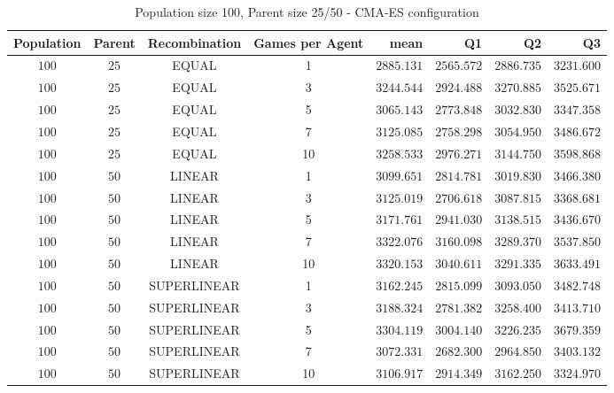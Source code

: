 \begin{table}[H]
\centering
\small
\begin{tabular}{c c c c r r r r}
Population & Parent & Recombination & Games per Agent & mean & Q1 & Q2 & Q3\\
\hline
$100$ & $25$ & EQUAL & 1 & $2885.131$ & $2565.572$ & $2886.735$ & $3231.600$\\
\hdashline
$100$ & $25$ & EQUAL & 3 & $3244.544$ & $2924.488$ & $3270.885$ & $3525.671$\\
\hdashline
$100$ & $25$ & EQUAL & 5 & $3065.143$ & $2773.848$ & $3032.830$ & $3347.358$\\
$100$ & $25$ & EQUAL & 7 & $3125.085$ & $2758.298$ & $3054.950$ & $3486.672$\\
$100$ & $25$ & EQUAL & 10 & $3258.533$ & $2976.271$ & $3144.750$ & $3598.868$\\
$100$ & $50$ & LINEAR & 1 & $3099.651$ & $2814.781$ & $3019.830$ & $3466.380$\\
$100$ & $50$ & LINEAR & 3 & $3125.019$ & $2706.618$ & $3087.815$ & $3368.681$\\
$100$ & $50$ & LINEAR & 5 & $3171.761$ & $2941.030$ & $3138.515$ & $3436.670$\\
\hdashline
$100$ & $50$ & LINEAR & 7 & $3322.076$ & $3160.098$ & $3289.370$ & $3537.850$\\
\hdashline
$100$ & $50$ & LINEAR & 10 & $3320.153$ & $3040.611$ & $3291.335$ & $3633.491$\\
$100$ & $50$ & SUPERLINEAR & 1 & $3162.245$ & $2815.099$ & $3093.050$ & $3482.748$\\
$100$ & $50$ & SUPERLINEAR & 3 & $3188.324$ & $2781.382$ & $3258.400$ & $3413.710$\\
\hdashline
$100$ & $50$ & SUPERLINEAR & 5 & $3304.119$ & $3004.140$ & $3226.235$ & $3679.359$\\
\hdashline
$100$ & $50$ & SUPERLINEAR & 7 & $3072.331$ & $2682.300$ & $2964.850$ & $3403.132$\\
$100$ & $50$ & SUPERLINEAR & 10 & $3106.917$ & $2914.349$ & $3162.250$ & $3324.970$\\
\end{tabular}
\caption{Population size 100, Parent size 25/50 - CMA-ES configuration}
\end{table}

\clearpage

